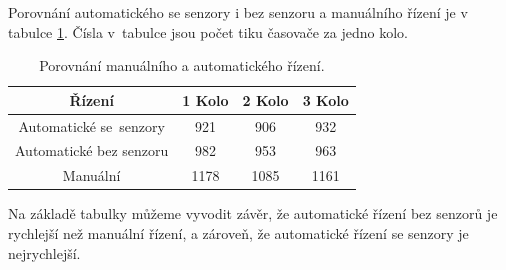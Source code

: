 Porovnání automatického se senzory i bez senzoru a manuálního řízení je v tabulce 
\ref{tab:Comparison}. Čísla v~tabulce jsou počet tiku časovače za jedno kolo.
\begin{table}[!h]
    \centering
    \begin{tabular}{cccc}
        \hline
        \textbf{Řízení} & \textbf{1 Kolo} & \textbf{2 Kolo} & \textbf{3 Kolo} \\
        \hline
        Automatické se~senzory          & 921       & 906 & 932          \\
        Automatické bez senzoru & 982 & 953 & 963 \\
        Manuální 			  & 1178       & 1085 & 1161           \\
        \hline
    \end{tabular}
    \caption{Porovnání manuálního a automatického řízení.}
    \label{tab:Comparison}
\end{table}

Na základě tabulky můžeme vyvodit závěr, že automatické řízení bez senzorů je 
rychlejší než manuální řízení, a zároveň, že automatické řízení se senzory je 
nejrychlejší.

\endinput
